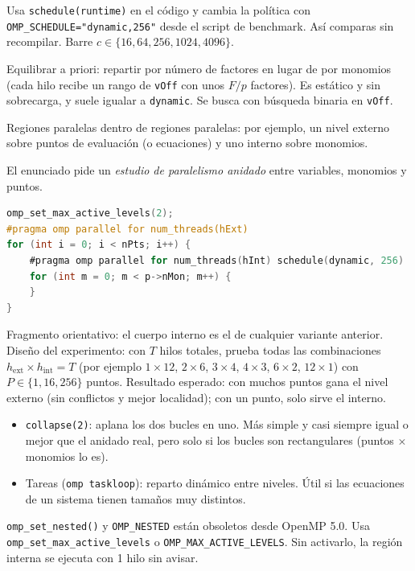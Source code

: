 \como Usa \texttt{schedule(runtime)} en el código y cambia la política con \texttt{OMP\_SCHEDULE="dynamic,256"} desde el script de benchmark. Así comparas sin recompilar. Barre $c\in\{16,64,256,1024,4096\}$.

\alt Equilibrar a priori: repartir por número de factores en lugar de por monomios (cada hilo recibe un rango de \texttt{vOff} con unos $F/p$ factores). Es estático y sin sobrecarga, y suele igualar a \texttt{dynamic}. Se busca con búsqueda binaria en \texttt{vOff}.

\que Regiones paralelas dentro de regiones paralelas: por ejemplo, un nivel externo sobre puntos de evaluación (o ecuaciones) y uno interno sobre monomios.

\porque El enunciado pide un \emph{estudio de paralelismo anidado} entre variables, monomios y puntos.

\como
\begin{lstlisting}[language=C]
omp_set_max_active_levels(2);
#pragma omp parallel for num_threads(hExt)
for (int i = 0; i < nPts; i++) {
    #pragma omp parallel for num_threads(hInt) schedule(dynamic, 256)
    for (int m = 0; m < p->nMon; m++) {
    }
}
\end{lstlisting}
Fragmento orientativo: el cuerpo interno es el de cualquier variante anterior. Diseño del experimento: con $T$ hilos totales, prueba todas las combinaciones $h_{\text{ext}}\times h_{\text{int}}=T$ (por ejemplo $1\times12$, $2\times6$, $3\times4$, $4\times3$, $6\times2$, $12\times1$) con $P\in\{1,16,256\}$ puntos. Resultado esperado: con muchos puntos gana el nivel externo (sin conflictos y mejor localidad); con un punto, solo sirve el interno.

\alt
\begin{itemize}
\item \texttt{collapse(2)}: aplana los dos bucles en uno. Más simple y casi siempre igual o mejor que el anidado real, pero solo si los bucles son rectangulares (puntos $\times$ monomios lo es).
\item Tareas (\texttt{omp taskloop}): reparto dinámico entre niveles. Útil si las ecuaciones de un sistema tienen tamaños muy distintos.
\end{itemize}

\begin{trampa}
\texttt{omp\_set\_nested()} y \texttt{OMP\_NESTED} están obsoletos desde OpenMP 5.0. Usa \texttt{omp\_set\_max\_active\_levels} o \texttt{OMP\_MAX\_ACTIVE\_LEVELS}. Sin activarlo, la región interna se ejecuta con 1 hilo sin avisar.
\end{trampa}

